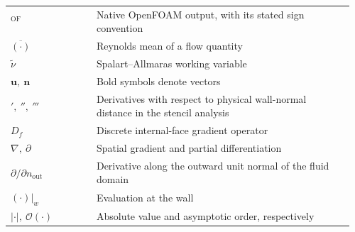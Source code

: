 \begin{longtable}{@{}p{0.24\linewidth}p{0.72\linewidth}@{}}
\({}^{\mathrm{OF}}\) & Native OpenFOAM output, with its stated sign convention \\
\(\overline{(\cdot)}\) & Reynolds mean of a flow quantity \\
\(\widetilde{\nu}\) & Spalart--Allmaras working variable \\
\(\boldsymbol{u},\ \boldsymbol{n}\) & Bold symbols denote vectors \\
\({}',\ {}'',\ {}'''\) & Derivatives with respect to physical wall-normal distance in the stencil analysis \\
\(D_f\) & Discrete internal-face gradient operator \\
\(\nabla,\ \partial\) & Spatial gradient and partial differentiation \\
\(\partial/\partial n_{\mathrm{out}}\) & Derivative along the outward unit normal of the fluid domain \\
\(\left.(\cdot)\right|_w\) & Evaluation at the wall \\
\(|\cdot|,\ \mathcal{O}(\cdot)\) & Absolute value and asymptotic order, respectively \\
\end{longtable}
\endgroup
